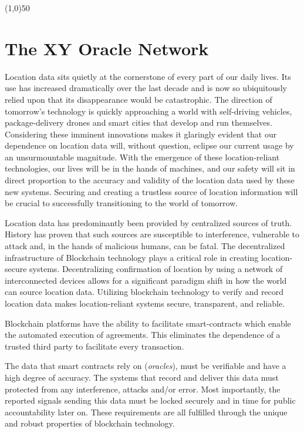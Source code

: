 \documentclass{article}
\begin{document}
\begin{center}
\line(1,0){50}
\end{center}

\section{The XY Oracle Network}

Location data sits quietly at the cornerstone of every part of our daily lives. Its use has increased dramatically over the last decade and is now so ubiquitously relied upon that its disappearance would be catastrophic. The direction of tomorrow's technology is quickly approaching a world with self-driving vehicles, package-delivery drones and smart cities that develop and run themselves. Considering these imminent innovations makes it glaringly evident that our dependence on location data will, without question, eclipse our current usage by an unsurmountable magnitude. With the emergence of these location-reliant technologies, our lives will be in the hands of machines, and our safety will sit in direct proportion to the \gls{accuracy} and validity of the location data used by these new systems. Securing and creating a \gls{trustless} source of location information will be crucial to successfully transitioning to the world of tomorrow.

Location data has predominantly been provided by centralized sources of truth. History has proven that such sources are susceptible to interference, vulnerable to attack and, in the hands of malicious humans, can be fatal. The decentralized infrastructure of Blockchain technology plays a critical role in creating location-secure systems. Decentralizing confirmation of location by using a network of interconnected devices allows for a significant paradigm shift in how the world can source location data. Utilizing blockchain technology to verify and record location data makes location-reliant systems secure, transparent, and reliable.

Blockchain platforms have the ability to facilitate \glspl{smart-contract} which enable the automated execution of agreements. This eliminates the dependence of a trusted third party to facilitate every transaction.

The data that smart contracts rely on (\textit{\glspl{oracle}}), must be verifiable and have a high degree of accuracy. The systems that record and deliver this data must protected from any interference, attacks and/or error. Most importantly, the reported signals sending this data must be locked securely and in time for public accountability later on. These requirements are all fulfilled through the unique and robust properties of blockchain technology.
\end{document}
